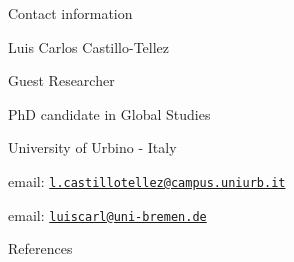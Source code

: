 \documentclass[
  ignorenonframetext,
]{beamer}
\newif\ifbibliography
\begin{document}
\begin{frame}{Contact information}
\protect\hypertarget{contact-information}{}
\vspace{2cm}

Luis Carlos Castillo-Tellez

\vspace{0.1cm}

Guest Researcher

PhD candidate in Global Studies

University of Urbino - Italy

email:
\href{mailto:l.castillotellez@campus.uniurb.it}{\nolinkurl{l.castillotellez@campus.uniurb.it}}

email:
\href{mailto:luiscarl@uni-bremen.de}{\nolinkurl{luiscarl@uni-bremen.de}}
\end{frame}

\renewcommand\refname{References}
\begin{frame}[allowframebreaks]{References}
  \bibliographytrue
  
\end{frame}
\end{document}
